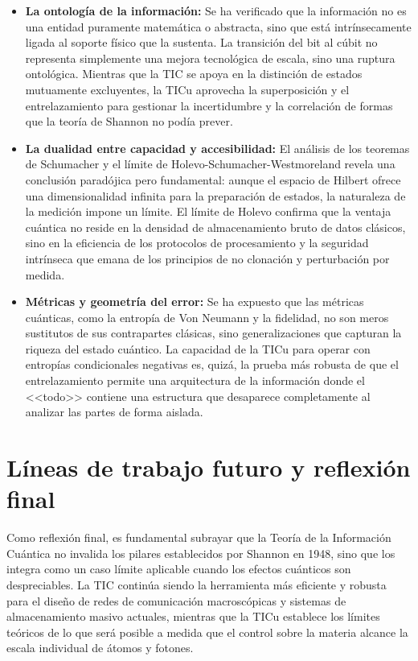 \documentclass[11pt,a4paper,spanish]{book}
\begin{document}
\begin{itemize}
    \item \textbf{La ontología de la información:} Se ha verificado que la información no es una entidad puramente matemática o abstracta, sino que está intrínsecamente ligada al soporte físico que la sustenta. La transición del bit al cúbit no representa simplemente una mejora tecnológica de escala, sino una ruptura ontológica. Mientras que la TIC se apoya en la distinción de estados mutuamente excluyentes, la TICu aprovecha la superposición y el entrelazamiento para gestionar la incertidumbre y la correlación de formas que la teoría de Shannon no podía prever.
    
    \item \textbf{La dualidad entre capacidad y accesibilidad:} El análisis de los teoremas de Schumacher y el límite de Holevo-Schumacher-Westmoreland revela una conclusión paradójica pero fundamental: aunque el espacio de Hilbert ofrece una dimensionalidad infinita para la preparación de estados, la naturaleza de la medición impone un límite. El límite de Holevo confirma que la ventaja cuántica no reside en la densidad de almacenamiento bruto de datos clásicos, sino en la eficiencia de los protocolos de procesamiento y la seguridad intrínseca que emana de los principios de no clonación y perturbación por medida.
    
    \item \textbf{Métricas y geometría del error:} Se ha expuesto que las métricas cuánticas, como la entropía de Von Neumann y la fidelidad, no son meros sustitutos de sus contrapartes clásicas, sino generalizaciones que capturan la riqueza del estado cuántico. La capacidad de la TICu para operar con entropías condicionales negativas es, quizá, la prueba más robusta de que el entrelazamiento permite una arquitectura de la información donde el <<todo>> contiene una estructura que desaparece completamente al analizar las partes de forma aislada.
\end{itemize}

\section{Líneas de trabajo futuro y reflexión final}

Como reflexión final, es fundamental subrayar que la Teoría de la Información Cuántica no invalida los pilares establecidos por Shannon en 1948, sino que los integra como un caso límite aplicable cuando los efectos cuánticos son despreciables. La TIC continúa siendo la herramienta más eficiente y robusta para el diseño de redes de comunicación macroscópicas y sistemas de almacenamiento masivo actuales, mientras que la TICu establece los límites teóricos de lo que será posible a medida que el control sobre la materia alcance la escala individual de átomos y fotones.
\end{document}

